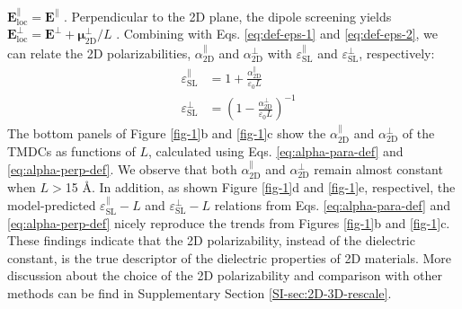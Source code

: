 \documentclass[journal=ancac3,manuscript=article,email=true,hyperref=true,keywords=false]{achemso}
\begin{document}
$\boldsymbol{E}^{\parallel}_{\mathrm{loc}}=\boldsymbol{E}^{\parallel}$
\cite{Markel_2016}. Perpendicular to the 2D plane, the dipole
screening yields
$\boldsymbol{E}_{\mathrm{loc}}^{\perp}=\boldsymbol{E}^{\perp}+\boldsymbol{\mu}_{\mathrm{2D}}^{\perp}/L$
\cite{Meyer_2001_dipole_slab,T_bik_2004}. Combining with
Eqs. \ref{eq:def-eps-1} and \ref{eq:def-eps-2}, we can relate the 2D polarizabilities,
$\alpha_{\mathrm{2D}}^{\parallel}$ and $\alpha_{\mathrm{2D}}^{\perp}$ with $\varepsilon_{\mathrm{SL}}^{\parallel}$ and $\varepsilon_{\mathrm{SL}}^{\perp}$, respectively:
\begin{subequations}
\begin{eqnarray}
  \label{eq:alpha-para-def}
  &\varepsilon_{\mathrm{SL}}^{\parallel} &= 1 + \frac{\alpha_{\mathrm{2D}}^{\parallel}}{\varepsilon_{0}L}\\
  \label{eq:alpha-perp-def}
  &\varepsilon_{\mathrm{SL}}^{\perp} &= \left(1 - {\displaystyle \frac{\alpha_{\mathrm{2D}}^{\perp}}{\varepsilon_{\mathrm{0}} L}} \right)^{-1}
\end{eqnarray}
\end{subequations}
The bottom panels of Figure \ref{fig-1}b and \ref{fig-1}c show the
$\alpha_{\mathrm{2D}}^{\parallel}$ and $\alpha_{\mathrm{2D}}^{\perp}$
of the TMDCs as functions of $L$, calculated using
Eqs. \ref{eq:alpha-para-def} and \ref{eq:alpha-perp-def}. We observe
that both $\alpha_{\mathrm{2D}}^{\parallel}$ and
$\alpha_{\mathrm{2D}}^{\perp}$ remain almost constant when $L>$15
\AA{}. In addition, as shown Figure \ref{fig-1}d and \ref{fig-1}e,
respectivel, the model-predicted
$\varepsilon_{\mathrm{SL}}^{\parallel}-L$ and
$\varepsilon_{\mathrm{SL}}^{\perp}-L$ relations from Eqs.
\ref{eq:alpha-para-def} and \ref{eq:alpha-perp-def} nicely reproduce
the trends from Figures \ref{fig-1}b and \ref{fig-1}c. These findings
indicate that the 2D polarizability, instead of the dielectric
constant, is the true descriptor of the dielectric properties of 2D
materials. More discussion about the choice of the 2D polarizability
and comparison with other methods can be find in Supplementary Section
\ref{SI-sec:2D-3D-rescale}.
\end{document}
